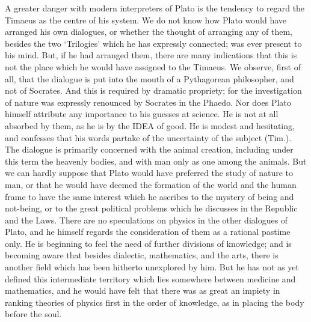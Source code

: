 A greater danger with modern interpreters of Plato is the tendency to
regard the Timaeus as the centre of his system. We do not know how Plato
would have arranged his own dialogues, or whether the thought of arranging
any of them, besides the two ‘Trilogies’ which he has expressly connected;
was ever present to his mind. But, if he had arranged them, there are many
indications that this is not the place which he would have assigned to the
Timaeus. We observe, first of all, that the dialogue is put into the mouth
of a Pythagorean philosopher, and not of Socrates. And this is required by
dramatic propriety; for the investigation of nature was expressly
renounced by Socrates in the Phaedo. Nor does Plato himself attribute any
importance to his guesses at science. He is not at all absorbed by them,
as he is by the IDEA of good. He is modest and hesitating, and confesses
that his words partake of the uncertainty of the subject (Tim.). The
dialogue is primarily concerned with the animal creation, including under
this term the heavenly bodies, and with man only as one among the animals.
But we can hardly suppose that Plato would have preferred the study of
nature to man, or that he would have deemed the formation of the world and
the human frame to have the same interest which he ascribes to the mystery
of being and not-being, or to the great political problems which he
discusses in the Republic and the Laws. There are no speculations on
physics in the other dialogues of Plato, and he himself regards the
consideration of them as a rational pastime only. He is beginning to feel
the need of further divisions of knowledge; and is becoming aware that
besides dialectic, mathematics, and the arts, there is another field which
has been hitherto unexplored by him. But he has not as yet defined this
intermediate territory which lies somewhere between medicine and
mathematics, and he would have felt that there was as great an impiety in
ranking theories of physics first in the order of knowledge, as in placing
the body before the soul.

